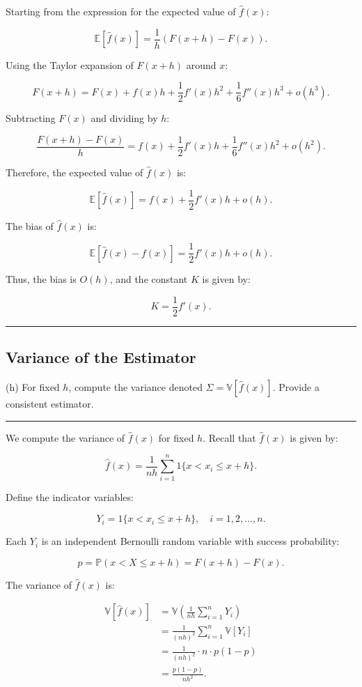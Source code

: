 \documentclass{article}
\newenvironment{colorparagraph}[1]{\par\color{#1}}{\par}
\begin{document}
Starting from the expression for the expected value of \( \hat{f}(x) \):

\[
\mathbb{E}[\hat{f}(x)] = \frac{1}{h} \left( F(x + h) - F(x) \right).
\]

Using the Taylor expansion of \( F(x + h) \) around \( x \):

\[
F(x + h) = F(x) + f(x) h + \frac{1}{2} f'(x) h^2 + \frac{1}{6} f''(x) h^3 + o(h^3).
\]

Subtracting \( F(x) \) and dividing by \( h \):

\[
\frac{F(x + h) - F(x)}{h} = f(x) + \frac{1}{2} f'(x) h + \frac{1}{6} f''(x) h^2 + o(h^2).
\]

Therefore, the expected value of \( \hat{f}(x) \) is:

\[
\mathbb{E}[\hat{f}(x)] = f(x) + \frac{1}{2} f'(x) h + o(h).
\]

The bias of \( \hat{f}(x) \) is:

\[
\mathbb{E}[\hat{f}(x) - f(x)] = \frac{1}{2} f'(x) h + o(h).
\]

Thus, the bias is \( O(h) \), and the constant \( K \) is given by:

\[
K = \frac{1}{2} f'(x).
\]

\begin{colorparagraph}{questioncolor}
\label{q2h}
\rule{\textwidth}{0.5pt}
\subsection{Variance of the Estimator}
(h) For fixed \( h \), compute the variance denoted \( \Sigma = \mathbb{V}[\hat{f}(x)] \). Provide a consistent estimator.

\rule{\textwidth}{0.5pt}
\end{colorparagraph}

We compute the variance of \( \hat{f}(x) \) for fixed \( h \). Recall that \( \hat{f}(x) \) is given by:

\[
\hat{f}(x) = \frac{1}{n h} \sum_{i=1}^n 1\{ x < x_i \leq x + h \}.
\]

Define the indicator variables:

\[
Y_i = 1\{ x < x_i \leq x + h \}, \quad i = 1, 2, \dots, n.
\]

Each \( Y_i \) is an independent Bernoulli random variable with success probability:

\[
p = \mathbb{P}(x < X \leq x + h) = F(x + h) - F(x).
\]

The variance of \( \hat{f}(x) \) is:

\[
\begin{aligned}
\mathbb{V}[\hat{f}(x)] &= \mathbb{V}\left( \frac{1}{n h} \sum_{i=1}^n Y_i \right) \\
&= \frac{1}{(n h)^2} \sum_{i=1}^n \mathbb{V}[Y_i] \\
&= \frac{1}{(n h)^2} \cdot n \cdot p (1 - p) \\
&= \frac{p (1 - p)}{n h^2}.
\end{aligned}
\]
\end{document}
